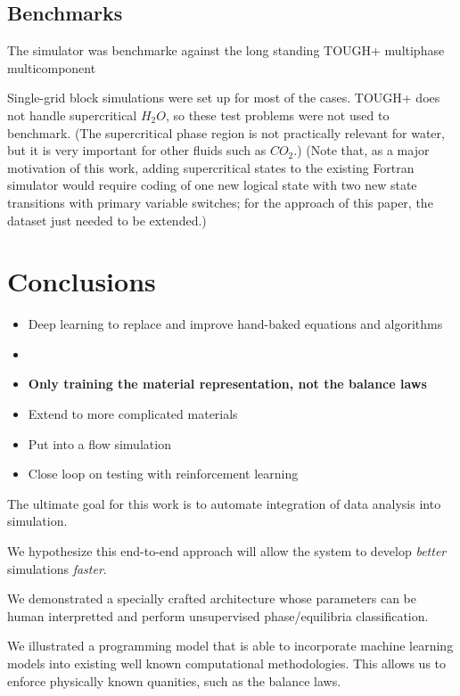 \documentclass[]{article}
\begin{document}
\hypertarget{header-n3418}{%
\subsection{Benchmarks}\label{header-n3418}}

The simulator was benchmarke against the long standing TOUGH+ multiphase
multicomponent

Single-grid block simulations were set up for most of the cases. TOUGH+
does not handle supercritical \(H_2O\), so these test problems were not
used to benchmark. (The supercritical phase region is not practically
relevant for water, but it is very important for other fluids such as
\(CO_2\).) (Note that, as a major motivation of this work, adding
supercritical states to the existing Fortran simulator would require
coding of one new logical state with two new state transitions with
primary variable switches; for the approach of this paper, the dataset
just needed to be extended.)

\hypertarget{header-n3421}{%
\section{Conclusions}\label{header-n3421}}

\begin{itemize}
\item
  Deep learning to replace and improve hand-baked equations and
  algorithms
\item
\item
  \textbf{Only training the material representation, not the balance
  laws}
\item
  Extend to more complicated materials
\item
  Put into a flow simulation
\item
  Close loop on testing with reinforcement learning
\end{itemize}

The ultimate goal for this work is to automate integration of data
analysis into simulation.

We hypothesize this end-to-end approach will allow the system to develop
\emph{better} simulations \emph{faster}.

We demonstrated a specially crafted architecture whose parameters can be
human interpretted and perform unsupervised phase/equilibria
classification.

We illustrated a programming model that is able to incorporate machine
learning models into existing well known computational methodologies.
This allows us to enforce physically known quanities, such as the
balance laws.
\end{document}
